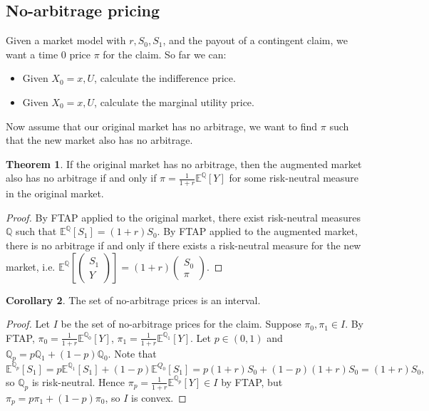 \documentclass{article}
\theoremstyle{definition}
\newtheorem{theorem}{Theorem}[section]
\newtheorem{cor}[theorem]{Corollary}
\begin{document}
\subsection{No-arbitrage pricing}
Given a market model with $r, S_0, S_1$, and the payout of a contingent claim, we want a time 0 price $\pi$ for the claim. So far we can:
\begin{itemize}
    \item Given $X_0=x, U$, calculate the indifference price.
    \item Given $X_0=x, U$, calculate the marginal utility price.
\end{itemize}
Now assume that our original market has no arbitrage, we want to find $\pi$ such that the new market also has no arbitrage.
\begin{theorem}
    If the original market has no arbitrage, then the augmented market also has no arbitrage if and only if $\pi = \frac{1}{1+r}\mathbb{E}^\mathbb{Q}[Y]$ for some risk-neutral measure in the original market.
\end{theorem}
\begin{proof}
    By FTAP applied to the original market, there exist risk-neutral measures $\mathbb{Q}$ such that $\mathbb{E}^\mathbb{Q}[S_1]=(1+r)S_0$. By FTAP applied to the augmented market, there is no arbitrage if and only if there exists a risk-neutral measure for the new market, i.e. $\mathbb{E}^\mathbb{Q}\left[\begin{pmatrix} S_1 \\ Y \end{pmatrix}\right] = (1+r)\begin{pmatrix} S_0 \\ \pi \end{pmatrix}$.
\end{proof}
\begin{cor}
    The set of no-arbitrage prices is an interval.
\end{cor}
\begin{proof}
    Let $I$ be the set of no-arbitrage prices for the claim. Suppose $\pi_0,\pi_1 \in I$. By FTAP, $\pi_0 = \frac{1}{1+r} \mathbb{E}^{\mathbb{Q}_0}[Y]$, $\pi_1 = \frac{1}{1+r}\mathbb{E}^{\mathbb{Q}_1}[Y]$. Let $p \in (0,1)$ and $\mathbb{Q}_p = p\mathbb{Q}_1 + (1-p)\mathbb{Q}_0$. Note that 
    \[
    \mathbb{E}^{\mathbb{Q}_p}[S_1] = p \mathbb{E}^{\mathbb{Q}_1}[S_1] + (1-p) \mathbb{E}^{Q_0}[S_1] = p(1+r)S_0 + (1-p)(1+r)S_0 = (1+r)S_0,
    \]
    so $\mathbb{Q}_p$ is risk-neutral. Hence $\pi_p = \frac{1}{1+r} \mathbb{E}^{\mathbb{Q}_p}[Y] \in I$ by FTAP, but $\pi_p = p \pi_1 + (1-p) \pi_0$, so $I$ is convex. 
\end{proof}
\end{document}
